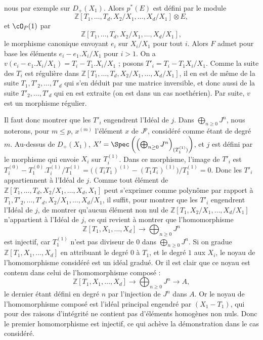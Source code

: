 nous par exemple sur \(D_+(X_1)\). Alors \(p^*(E)\) est défini par le module
\[
 \mathbb Z[T_1,\ldots,T_d,X_2/X_1,\ldots,X_d/X_1]\otimes E,
\]
et \(\cO_P(1)\) par
\[
 \mathbb Z[T_1,\ldots,T_d,X_2/X_1,\ldots,X_d/X_1],
\]
le morphisme canonique envoyant \(e_i\) sur \(X_i/X_1\) pour tout \(i\). Alors \(F\) admet pour base les éléments \(e_i-e_1.X_i/X_1\) pour \(i>1\).
On a \(v(e_i-e_1.X_i/X_1)=T_i-T_1.X_i/X_1\) ; posons \(T'_i=T_i-T_1X_i/X_1\).
Comme la suite des \(T_i\) est régulière dans \(\mathbb Z[T_1,\ldots,T_d,X_2/X_1,\ldots,X_d/X_1]\), il en est de même de la suite \(T_1,T'_2,\ldots,T'_d\) qui s'en déduit par une matrice inversible, et donc aussi de la suite \(T'_2,\ldots,T'_d\) qui en est extraite (on est dans un cas noethérien). Par suite, \(v\) est un morphisme régulier.

Il faut donc montrer que les \(T'_i\) engendrent l'Idéal de \(j\). Dans \(\bigoplus_{n\ge0}J^n\), nous noterons, pour \(m\le p\), \(x^{(m)}\) l'élément \(x\) de \(J^p\), considéré comme étant de degré \(m\). Au-dessus de \(D_+(X_1)\), \(X'=\Spec\left(\left(\bigoplus_{n\ge0}J^n\right)_{(T_1^{(1)})}\right)\), et \(j\) est défini par le morphisme qui envoie \(X_i\) sur \(T_i^{(1)}\). Dans ce morphisme, l'image de \(T'_i\) est \(T_i^{(0)}-T_1^{(0)}.T_i^{(1)}/T_1^{(1)}=\bigl((T_iT_1)^{(1)}-(T_1T_i)^{(1)}\bigr)/T_1^{(1)}=0\). Donc les \(T'_i\) appartiennent à l'Idéal de \(j\). Comme tout élément de \(\mathbb Z[T_1,\ldots,T_d,X_2/X_1,\ldots,X_d,X_1]\) peut s'exprimer comme polynôme par rapport à \(T_1,T'_2,\ldots,T'_d,X_2/X_1,\ldots,X_d/X_1\), il suffit, pour montrer que les \(T'_i\) engendrent l'Idéal de \(j\), de montrer qu'aucun élément non nul de \(\mathbb Z[T_1,X_2/X_1,\ldots,X_d/X_1]\) n'appartient à l'Idéal de \(j\), ce qui revient à montrer que l'homomorphisme
\[
\mathbb Z[T_1,X_1,\ldots,X_d]\longrightarrow\bigoplus_{n\ge0}J^n
\]
est injectif, car \(T_1^{(1)}\) n'est pas diviseur de 0 dans \(\bigoplus_{n\ge0}J^n\). Si on gradue \(\mathbb Z[T_1,X_1,\ldots,X_d]\) en attribuant le degré \(0\) à \(T_1\), et le degré \(1\) aux \(X_i\), le noyau de l'homomorphisme considéré est un idéal gradué. Or il est clair que ce
noyau est contenu dans celui de l'homomorphisme composé :
\[
\mathbb Z[T_1,X_1,\ldots,X_d]\longrightarrow
\bigoplus_{n\ge0}J^n\longrightarrow A,
\]
le dernier étant défini en degré \(n\) par l'injection de \(J^n\) dans \(A\). Or le noyau de l'homomorphisme composé est l'idéal principal engendré par \((X_1-T_1)\), qui pour des raisons d'intégrité ne contient pas d'éléments homogènes non nuls. Donc le premier homomorphisme est injectif, ce qui achève la démonstration dans le cas considéré.

